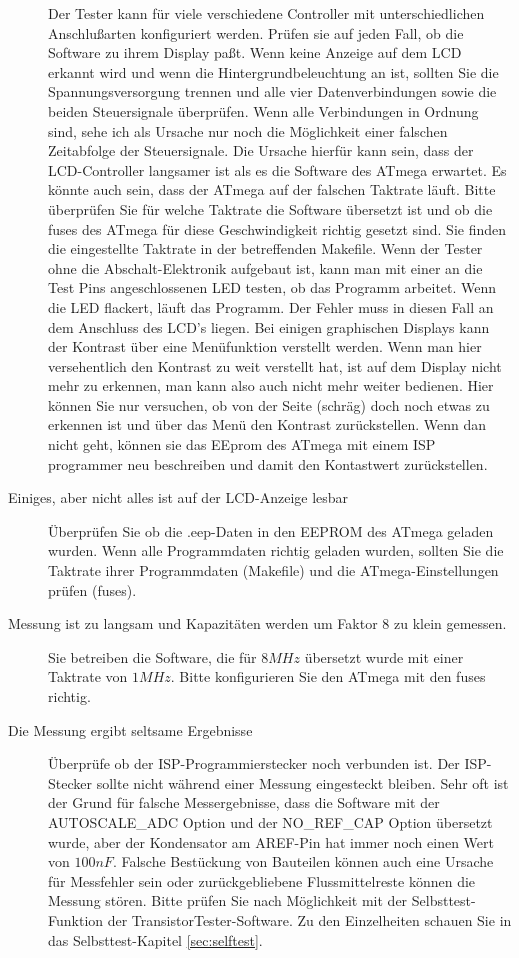 \begin{description}
Der Tester kann für viele verschiedene Controller mit unterschiedlichen Anschlußarten
konfiguriert werden. Prüfen sie auf jeden Fall, ob die Software zu ihrem Display paßt.
Wenn keine Anzeige auf dem LCD erkannt wird und wenn die Hintergrundbeleuchtung an ist,
sollten Sie die Spannungsversorgung trennen und alle vier Datenverbindungen sowie die 
beiden Steuersignale überprüfen.
Wenn alle Verbindungen in Ordnung sind, sehe ich als Ursache nur noch die Möglichkeit einer
falschen Zeitabfolge der Steuersignale.
Die Ursache hierfür kann sein, dass der LCD-Controller langsamer ist als es die Software
des ATmega erwartet. Es könnte auch sein, dass der ATmega auf der falschen Taktrate läuft.
Bitte überprüfen Sie für welche Taktrate die Software übersetzt ist und ob
die fuses des ATmega für diese Geschwindigkeit richtig gesetzt sind.
Sie finden die eingestellte Taktrate in der betreffenden Makefile.
Wenn der Tester ohne die Abschalt-Elektronik aufgebaut ist, kann man mit einer
an die Test Pins angeschlossenen LED testen, ob das Programm arbeitet.
Wenn die LED flackert, läuft das Programm. Der Fehler muss in diesen Fall an
dem Anschluss des LCD's liegen. 
Bei einigen graphischen Displays kann der Kontrast über eine Menüfunktion verstellt werden.
Wenn man hier versehentlich den Kontrast zu weit verstellt hat, ist auf dem Display
nicht mehr zu erkennen, man kann also auch nicht mehr weiter bedienen.
Hier können Sie nur versuchen, ob von der Seite (schräg) doch noch etwas zu erkennen ist
und über das Menü den Kontrast zurückstellen. Wenn dan nicht geht, können sie
das EEprom des ATmega mit einem ISP programmer neu beschreiben und damit den Kontastwert zurückstellen.
\item[Einiges, aber nicht alles ist auf der LCD-Anzeige lesbar] 
Überprüfen Sie ob die .eep-Daten in den EEPROM des ATmega geladen wurden.
Wenn alle Programmdaten richtig geladen wurden, sollten Sie die Taktrate ihrer
Programmdaten (Makefile) und die ATmega-Einstellungen prüfen (fuses).

\item[Messung ist zu langsam und Kapazitäten werden um Faktor 8 zu klein gemessen.] 
Sie betreiben die Software, die für \(8MHz\) übersetzt wurde mit einer Taktrate von \(1MHz\).
Bitte konfigurieren Sie den ATmega mit den fuses richtig.

\item[Die Messung ergibt seltsame Ergebnisse]  
Überprüfe ob der ISP-Programmierstecker noch verbunden ist.
Der ISP-Stecker sollte nicht während einer Messung eingesteckt bleiben.
Sehr oft ist der Grund für falsche Messergebnisse, dass die Software mit der
 AUTOSCALE\_ADC Option und der NO\_REF\_CAP Option übersetzt wurde, aber der
Kondensator am AREF-Pin hat immer noch einen Wert von \(100nF\).
Falsche Bestückung von Bauteilen können auch eine Ursache für Messfehler sein 
oder zurückgebliebene Flussmittelreste können die Messung stören.
Bitte prüfen Sie nach Möglichkeit mit der Selbsttest-Funktion der
TransistorTester-Software.
Zu den Einzelheiten schauen Sie in das Selbsttest-Kapitel \ref{sec:selftest}.


\end{description}
